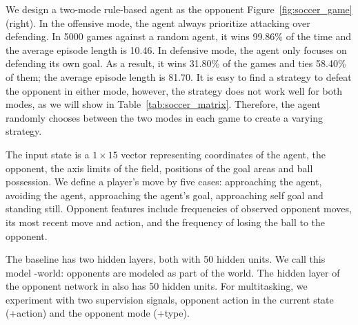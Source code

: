 We design a two-mode rule-based agent as the opponent Figure~\ref{fig:soccer_game}(right).
In the offensive mode, the agent always prioritize
attacking over defending.  In 5000 games against a random agent, it wins 99.86\%
of the time and the average episode length is 10.46.
In defensive mode, the agent only
focuses on defending its own goal.  As a result, it wins 31.80\% of the games
and ties 58.40\% of them; the average episode length is 81.70.
It is easy to find a strategy to defeat the opponent in either mode,
however, the strategy does not work well for both modes, as we will show in Table~\ref{tab:soccer_matrix}.
Therefore, the agent randomly chooses between the two modes in each game to create a varying strategy.

The input state is a $1\times 15$ vector representing coordinates of
the agent, the opponent, the axis limits of the field, positions of
the goal areas and ball possession.  We define a player's move
by five cases: approaching the agent, avoiding the agent, approaching the agent's goal,
approaching self goal and standing still.  Opponent features
include frequencies of observed opponent moves, its most recent move
and action, and the frequency of losing the ball to the opponent.

The baseline \dqn{} has two hidden layers, both with 50 hidden units.
We call this model \dqn{}-world: opponents are modeled as
part of the world.  The hidden layer of the opponent network in
\dron{} also has 50 hidden units.  For multitasking, we experiment
with two supervision signals, opponent action in the current state
(+action) and the opponent mode (+type).

